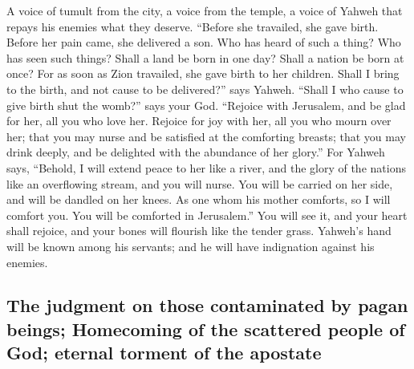  A voice of tumult from the city, a voice from the temple,
a voice of Yahweh that repays his enemies what they deserve.
 ``Before she travailed, she gave birth. Before her pain
came, she delivered a son.  Who has heard of such a thing?
Who has seen such things? Shall a land be born in one day? Shall a
nation be born at once? For as soon as Zion travailed, she gave birth to
her children.  Shall I bring to the birth, and not cause
to be delivered?'' says Yahweh. ``Shall I who cause to give birth shut
the womb?'' says your God.  ``Rejoice with Jerusalem, and
be glad for her, all you who love her. Rejoice for joy with her, all you
who mourn over her;  that you may nurse and be satisfied
at the comforting breasts; that you may drink deeply, and be delighted
with the abundance of her glory.''  For Yahweh says,
``Behold, I will extend peace to her like a river, and the glory of the
nations like an overflowing stream, and you will nurse. You will be
carried on her side, and will be dandled on her knees. 
As one whom his mother comforts, so I will comfort you. You will be
comforted in Jerusalem.''  You will see it, and your
heart shall rejoice, and your bones will flourish like the tender grass.
Yahweh's hand will be known among his servants; and he will have
indignation against his enemies.

\hypertarget{the-judgment-on-those-contaminated-by-pagan-beings-homecoming-of-the-scattered-people-of-god-eternal-torment-of-the-apostate}{%
\subsection{The judgment on those contaminated by pagan beings;
Homecoming of the scattered people of God; eternal torment of the
apostate}\label{the-judgment-on-those-contaminated-by-pagan-beings-homecoming-of-the-scattered-people-of-god-eternal-torment-of-the-apostate}}

